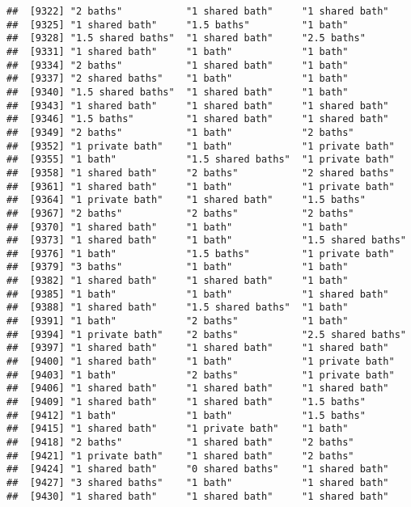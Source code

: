 \documentclass[
]{article}
\begin{document}
\begin{verbatim}
##  [9322] "2 baths"           "1 shared bath"     "1 shared bath"    
##  [9325] "1 shared bath"     "1.5 baths"         "1 bath"           
##  [9328] "1.5 shared baths"  "1 shared bath"     "2.5 baths"        
##  [9331] "1 shared bath"     "1 bath"            "1 bath"           
##  [9334] "2 baths"           "1 shared bath"     "1 bath"           
##  [9337] "2 shared baths"    "1 bath"            "1 bath"           
##  [9340] "1.5 shared baths"  "1 shared bath"     "1 bath"           
##  [9343] "1 shared bath"     "1 shared bath"     "1 shared bath"    
##  [9346] "1.5 baths"         "1 shared bath"     "1 shared bath"    
##  [9349] "2 baths"           "1 bath"            "2 baths"          
##  [9352] "1 private bath"    "1 bath"            "1 private bath"   
##  [9355] "1 bath"            "1.5 shared baths"  "1 private bath"   
##  [9358] "1 shared bath"     "2 baths"           "2 shared baths"   
##  [9361] "1 shared bath"     "1 bath"            "1 private bath"   
##  [9364] "1 private bath"    "1 shared bath"     "1.5 baths"        
##  [9367] "2 baths"           "2 baths"           "2 baths"          
##  [9370] "1 shared bath"     "1 bath"            "1 bath"           
##  [9373] "1 shared bath"     "1 bath"            "1.5 shared baths" 
##  [9376] "1 bath"            "1.5 baths"         "1 private bath"   
##  [9379] "3 baths"           "1 bath"            "1 bath"           
##  [9382] "1 shared bath"     "1 shared bath"     "1 bath"           
##  [9385] "1 bath"            "1 bath"            "1 shared bath"    
##  [9388] "1 shared bath"     "1.5 shared baths"  "1 bath"           
##  [9391] "1 bath"            "2 baths"           "1 bath"           
##  [9394] "1 private bath"    "2 baths"           "2.5 shared baths" 
##  [9397] "1 shared bath"     "1 shared bath"     "1 shared bath"    
##  [9400] "1 shared bath"     "1 bath"            "1 private bath"   
##  [9403] "1 bath"            "2 baths"           "1 private bath"   
##  [9406] "1 shared bath"     "1 shared bath"     "1 shared bath"    
##  [9409] "1 shared bath"     "1 shared bath"     "1.5 baths"        
##  [9412] "1 bath"            "1 bath"            "1.5 baths"        
##  [9415] "1 shared bath"     "1 private bath"    "1 bath"           
##  [9418] "2 baths"           "1 shared bath"     "2 baths"          
##  [9421] "1 private bath"    "1 shared bath"     "2 baths"          
##  [9424] "1 shared bath"     "0 shared baths"    "1 shared bath"    
##  [9427] "3 shared baths"    "1 bath"            "1 shared bath"    
##  [9430] "1 shared bath"     "1 shared bath"     "1 shared bath"    

\end{verbatim}
\end{document}
